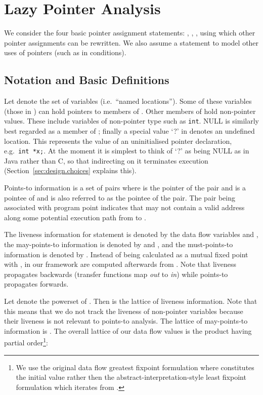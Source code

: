 \documentclass{llncs}
\newcommand{\Start}[1]{\text{{\sf\em start}}\xspace}
\newcommand{\var}{\text{\sf\bfseries\em V}\xspace}
\newcommand{\pt}[2]{\text{}}
\begin{document}
\section{Lazy Pointer Analysis}
\label{sec:lazy.pta}

We consider the four basic pointer assignment statements: ,
, ,  using which other pointer assignments can
be rewritten. We also assume a  statement to model
other uses of pointers (such as in conditions).

\subsection{Notation and Basic Definitions}





Let \var denote the set of variables (i.e.\ ``named locations''). Some
of these variables (those in ) can hold pointers
to members of . Other members of  hold non-pointer values.
These include variables of non-pointer type such as {\tt int}. NULL
is similarly best regarded as a member of ; finally a
special value `?' in  denotes an undefined location.
This represents the value of an uninitialised pointer declaration,
e.g.\ \mbox{\tt int *x;}. At the moment it is simplest to think of
`?' as being NULL as in Java rather than C, so that indirecting on it
terminates execution (Section~\ref{sec:design.choices} explains this).


Points-to information is a set of pairs \pt{x}{y} where
\text{} is the pointer of the pair and \text{}
is a pointee of  and is also referred to as the pointee of the pair.
The pair \pt{x}{?} being associated with program point  indicates
that  may not contain a valid address along some potential execution
path from \Start{p} to .

The liveness information for statement  is denoted by the data flow
variables \text{} and \text{}, the may-points-to
information is denoted by \text{} and \text{}, and
the must-points-to information is denoted by \text{}.
Instead of being calculated as a mutual fixed point with , in our framework \text{}
are computed afterwards from . Note that 
liveness propagates backwards (transfer functions map {\sf\em out\/} to
{\sf\em in\/}) while points-to propagates forwards.

Let \text{} denote the powerset of . Then \text{}
is the lattice of liveness information. Note that this means
that we do not track the liveness of non-pointer variables
because their liveness is not relevant to points-to analysis.
The lattice of may-points-to information is \text{}.
The overall lattice
of our data flow values is the product \text{} having
partial order\footnote{We use the original data flow greatest fixpoint
formulation where  constitutes the initial value rather
then the abstract-interpretation-style least fixpoint formulation which
iterates from .}:
\end{document}
